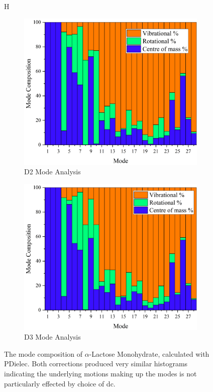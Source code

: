 \begin{figure}{H}
\centering
\begin{subfigure}{0.7\textwidth}
    \centering
    \includegraphics[scale=0.5]{Figures/Analysis/IVDW/D2ModeAnalG.png}
    \caption{D2 Mode Analysis}
    \label{fig:d2_mode_anal}
\end{subfigure}
\begin{subfigure}{1\textwidth}
    \centering
    \includegraphics[scale=0.5]{Figures/Analysis/IVDW/D3ModeAnalG.png}
    \caption{D3 Mode Analysis}
    \label{fig:d3_mode_anal}
\end{subfigure}
\captionsetup{font = footnotesize, justification = centering}
\caption[The Mode Composition of \(\alpha\)-Lactose Monohydrate]{The mode composition of \(\alpha\)-Lactose Monohydrate, calculated with PDielec. Both corrections produced very similar histograms indicating the underlying motions making up the modes is not particularly effected by choice of \acrshort{dc}.}
\label{fig:mode_anal}
\end{figure}


